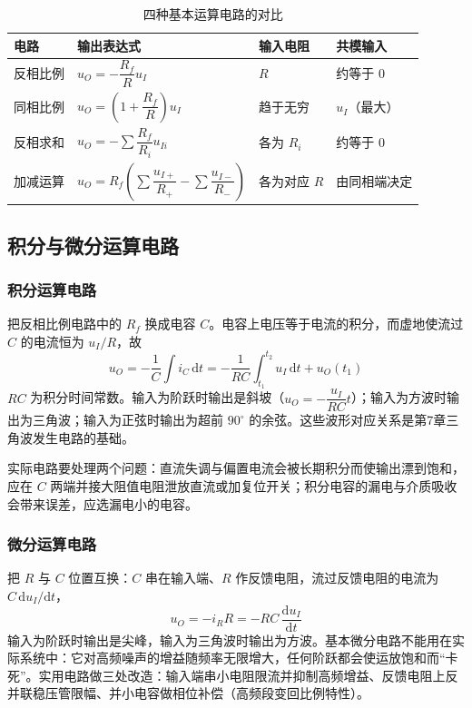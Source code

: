 \begin{table}[htbp]
\centering
\caption{四种基本运算电路的对比}
\begin{tabular}{@{}llll@{}}
\hline
电路 & 输出表达式 & 输入电阻 & 共模输入 \\
\hline
反相比例 & $u_O=-\dfrac{R_f}{R}u_I$ & $R$ & 约等于 0 \\
同相比例 & $u_O=\left(1+\dfrac{R_f}{R}\right)u_I$ & 趋于无穷 & $u_I$（最大） \\
反相求和 & $u_O=-\sum \dfrac{R_f}{R_i}u_{Ii}$ & 各为 $R_i$ & 约等于 0 \\
加减运算 & $u_O=R_f\left(\sum\dfrac{u_{I+}}{R_+}-\sum\dfrac{u_{I-}}{R_-}\right)$ & 各为对应 $R$ & 由同相端决定 \\
\hline
\end{tabular}
\end{table}

\subsection{积分与微分运算电路}
\subsubsection{积分运算电路}
把反相比例电路中的 $R_f$ 换成电容 $C$。电容上电压等于电流的积分，而虚地使流过 $C$ 的电流恒为 $u_I/R$，故
\begin{equation}
u_O = -\frac{1}{C}\int i_C\,\mathrm{d}t
= -\frac{1}{RC}\int_{t_1}^{t_2}u_I\,\mathrm{d}t + u_O(t_1)
\end{equation}
$RC$ 为积分时间常数。输入为阶跃时输出是斜坡（$u_O=-\dfrac{u_I}{RC}t$）；输入为方波时输出为三角波；输入为正弦时输出为超前 $90^\circ$ 的余弦。这些波形对应关系是第7章三角波发生电路的基础。

实际电路要处理两个问题：直流失调与偏置电流会被长期积分而使输出漂到饱和，应在 $C$ 两端并接大阻值电阻泄放直流或加复位开关；积分电容的漏电与介质吸收会带来误差，应选漏电小的电容。

\subsubsection{微分运算电路}
把 $R$ 与 $C$ 位置互换：$C$ 串在输入端、$R$ 作反馈电阻，流过反馈电阻的电流为 $C\,\mathrm{d}u_I/\mathrm{d}t$，
\begin{equation}
u_O = -i_R R = -RC\,\frac{\mathrm{d}u_I}{\mathrm{d}t}
\end{equation}
输入为阶跃时输出是尖峰，输入为三角波时输出为方波。基本微分电路不能用在实际系统中：它对高频噪声的增益随频率无限增大，任何阶跃都会使运放饱和而“卡死”。实用电路做三处改造：输入端串小电阻限流并抑制高频增益、反馈电阻上反并联稳压管限幅、并小电容做相位补偿（高频段变回比例特性）。

